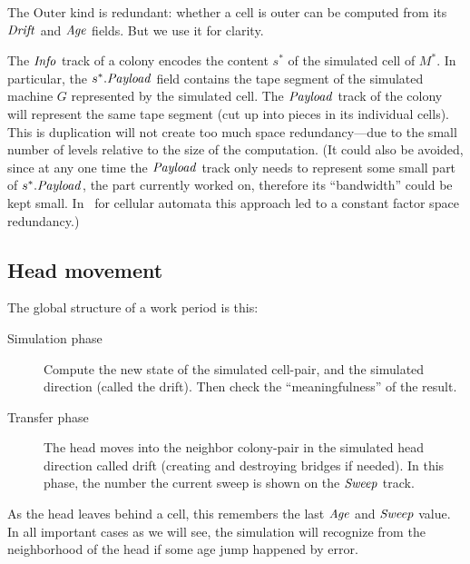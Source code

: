 \documentclass[11pt]{memoir}
\theoremstyle{definition} %
\newcommand{\fld}[1]{\ensuremath{\textit{#1\/}}}
\newcommand{\Age}{\fld{Age}} %
\newcommand{\Drift}{\fld{Drift}}
\newcommand{\Info}{\fld{Info}}
\newcommand{\Payload}{\fld{Payload}}
\newcommand{\Sweep}{\fld{Sweep}} %
\newcommand{\Outer}{\mathrm{Outer}}
\begin{document}
\begin{remark}
  The \( \Outer \) kind is redundant:
  whether a cell is outer can be computed from its \( \Drift \) and \( \Age \) fields.
  But we use it for clarity.
\end{remark}

\begin{remark}[Duplication]\label{rem:duplication}
  The \( \Info \) track of a colony encodes the content \( s^{*} \) of the simulated cell of \( M^{*} \).
  In particular, the \( s^{*}.\Payload \) field contains the tape segment of the simulated machine \( G \)
  represented by the simulated cell.
  The \( \Payload \) track of the colony will represent the same tape segment (cut up
  into pieces in its individual cells).
  This is duplication will not create too much space redundancy---due to
  the small number of levels relative to the size of the computation.
  (It could also be avoided, since at any one time the \( \Payload \) track only needs to represent
  some small part of \( s^{*}.\Payload \), the part currently worked on, therefore its ``bandwidth''
  could be kept small.
  In~\cite{GacsSorg01} for cellular automata this approach led to a constant
  factor space redundancy.)
  
\end{remark}

\subsection{Head movement}\label{sec:sweep}

The global structure of a work period is this:
\begin{description}

\item[Simulation phase]
Compute the new state of the simulated cell-pair, and the simulated direction (called the drift).
Then check the ``meaningfulness'' of the result.

\item[Transfer phase]
  The head moves into the neighbor colony-pair
  in the simulated head direction called drift (creating and destroying bridges if needed).
  In this phase, the number the current sweep is shown on the \( \Sweep \) track.
\end{description}

As the head leaves behind a cell, this remembers the last \( \Age \) and \( \Sweep \) value.
In all important cases as we will see, the simulation
will recognize from the neighborhood of the head if some age jump happened by error.
\end{document}
